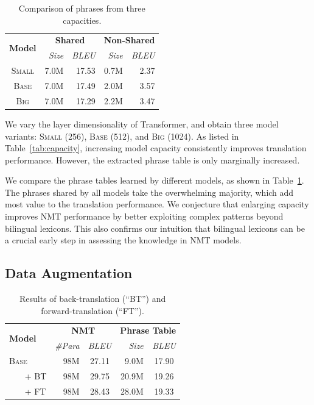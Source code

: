 \documentclass[11pt,a4paper]{article}
\begin{document}
\begin{table}[t]
\begin{center}
 \begin{tabular}{c|r|r||r|r}
  \multirow{2}{*}{\bf Model}  &  \multicolumn{2}{c||}{\bf Shared} &   \multicolumn{2}{c}{\bf Non-Shared} \\
  \cline{2-5}
        &  \em Size    & \em BLEU  &   \em Size   & \em BLEU  \\
  \hline
  \hline
  \textsc{Small}  & 7.0M  &  17.53 & 0.7M & 2.37 \\
  \textsc{Base}   & 7.0M  &  17.49 & 2.0M & 3.57\\
  \textsc{Big}    & 7.0M  &  17.29 & 2.2M & 3.47 \\
 \end{tabular} 
\end{center}
\caption{Comparison of phrases from three capacities.}
\label{tab:capacity-shared}
\end{table}

We vary the layer dimensionality of Transformer, and obtain three model variants: \textsc{Small} (256), \textsc{Base} (512), and \textsc{Big} (1024). As listed in Table~\ref{tab:capacity}, increasing model capacity consistently improves translation performance. However, the extracted phrase table is only marginally increased.

We compare the phrase tables learned by different models, as shown in Table~\ref{tab:capacity-shared}. The phrases shared by all models take the overwhelming majority, which add most value to the translation performance. We conjecture that enlarging capacity improves NMT performance by better exploiting complex patterns beyond bilingual lexicons. This also confirms our intuition that bilingual lexicons can be a crucial early step in assessing the knowledge in NMT models.








\subsection{Data Augmentation}
\label{sec:augmentation}



\begin{table}[t]
  \centering
  \begin{tabular}{l||r|c||r|c}
  \multirow{2}{*}{\bf Model}  &
  \multicolumn{2}{c||}{\bf NMT} &
  \multicolumn{2}{c}{\bf Phrase Table} \\
  \cline{2-5}
    \bf    & \em {\#Para}  & \em  BLEU & \em Size & \em BLEU\\
    \hline 
    \hline
    \textsc{Base}  & 98M   & 27.11 &  9.0M & 17.90 \\
    \hline
     ~~~ + BT         & 98M   & 29.75 & 20.9M & 19.26 \\
     ~~~ + FT         & 98M   & 28.43 & 28.0M & 19.33 \\
    \end{tabular}
  \caption{Results of back-translation (``BT'') and forward-translation (``FT'').}
  \label{tab:augmentation}
\end{table}
\end{document}
